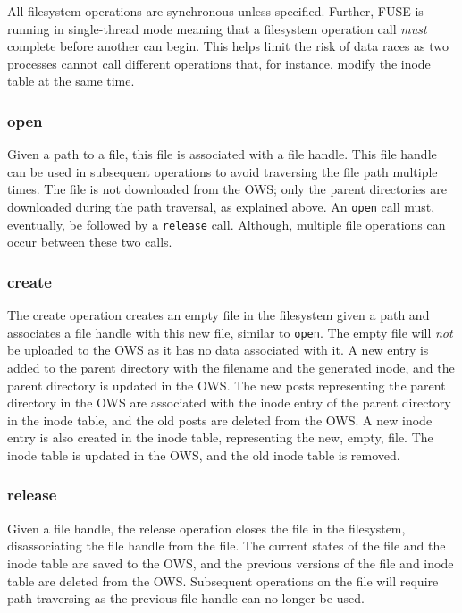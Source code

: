 All filesystem operations are synchronous unless specified. Further, \gls{FUSE} is running in \mbox{single-thread} mode meaning that a filesystem operation call \textit{must} complete before another can begin. This helps limit the risk of data races as two processes cannot call different operations that, for instance, modify the inode table at the same time.

\subsubsection{open}
Given a path to a file, this file is associated with a file handle. This file handle can be used in subsequent operations to avoid traversing the file path multiple times. The file is not downloaded from the \gls{OWS}; only the parent directories are downloaded during the path traversal, as explained above. An \texttt{open} call must, eventually, be followed by a \texttt{release} call. Although, multiple file operations can occur between these two calls.

\subsubsection{create}
The create operation creates an empty file in the filesystem given a path and associates a file handle with this new file, similar to \texttt{open}. The empty file will \textit{not} be uploaded to the \gls{OWS} as it has no data associated with it. A new entry is added to the parent directory with the filename and the generated inode, and the parent directory is updated in the \gls{OWS}. The new posts representing the parent directory in the \gls{OWS} are associated with the inode entry of the parent directory in the inode table, and the old posts are deleted from the \gls{OWS}. A new inode entry is also created in the inode table, representing the new, empty, file. The inode table is updated in the \gls{OWS}, and the old inode table is removed.

\subsubsection{release}
Given a file handle, the release operation closes the file in the filesystem, disassociating the file handle from the file. The current states of the file and the inode table are saved to the \gls{OWS}, and the previous versions of the file and inode table are deleted from the \gls{OWS}. Subsequent operations on the file will require path traversing as the previous file handle can no longer be used.


